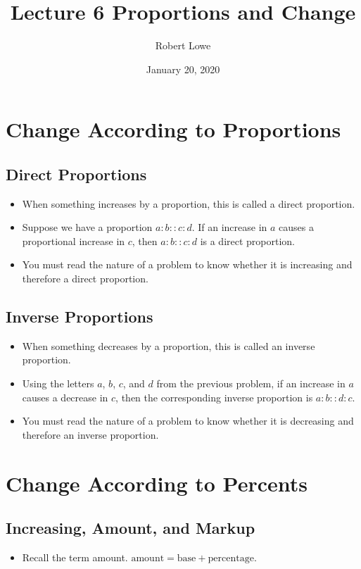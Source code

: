 \documentclass{article}
\title{Lecture 6 Proportions and Change}
\author{Robert Lowe}
\date{January 20, 2020}
\begin{document}
\maketitle

\section*{Change According to Proportions}
\subsection*{Direct Proportions}
\begin{itemize}
\item When something increases by a proportion, this is called a direct proportion.
\item Suppose we have a proportion $a:b :: c:d$.  If an increase in $a$ causes a proportional increase in $c$, then $a:b :: c:d$ is a direct proportion.  
\item You must read the nature of a problem to know whether it is increasing and therefore a direct proportion.
\end{itemize}

\subsection*{Inverse Proportions}
\begin{itemize}
\item When something decreases by a proportion, this is called an inverse proportion.
\item Using the letters $a$, $b$, $c$, and $d$ from the previous problem, if an increase in $a$ causes a decrease in $c$, then the corresponding inverse proportion is $a:b :: d:c$.
\item You must read the nature of a problem to know whether it is decreasing and therefore an inverse proportion.
\end{itemize}

\section*{Change According to Percents}
\subsection*{Increasing, Amount, and Markup}
\begin{itemize}
\item Recall the term amount.  $\mathrm{amount} = \mathrm{base} + \mathrm{percentage}$.
\end{itemize}
\end{document}
